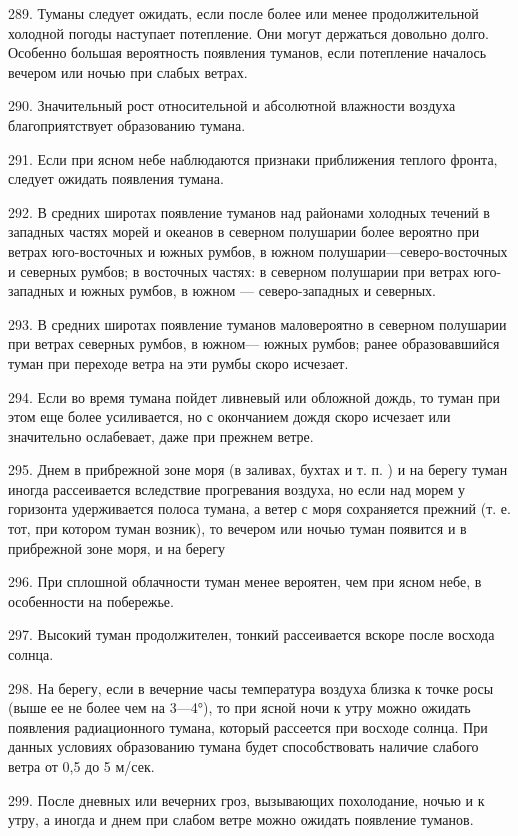 289. Туманы следует ожидать, если после более или менее продолжительной холодной погоды наступает потепление. Они могут держаться довольно долго. Особенно большая вероятность появления туманов, если потепление началось вечером или ночью при слабых ветрах.

290. Значительный рост относительной и абсолютной влажности воздуха благоприятствует образованию тумана.

291. Если при ясном небе наблюдаются признаки приближения теплого фронта, следует ожидать появления тумана.

292. В средних широтах появление туманов над районами холодных течений в западных частях морей и океанов в северном полушарии более вероятно при ветрах юго-восточных и южных румбов, в южном полушарии—северо-восточных и северных румбов; в восточных частях: в северном полушарии при ветрах юго-западных и южных румбов, в южном — северо-западных и северных.

293. В средних широтах появление туманов маловероятно в северном полушарии при ветрах северных румбов, в южном— южных румбов; ранее образовавшийся туман при переходе ветра на эти румбы скоро исчезает.

294. Если во время тумана пойдет ливневый или обложной дождь, то туман при этом еще более усиливается, но с окончанием дождя скоро исчезает или значительно ослабевает, даже при прежнем ветре.

295. Днем в прибрежной зоне моря (в заливах, бухтах и т. п. ) и на берегу туман иногда рассеивается вследствие прогревания воздуха, но если над морем у горизонта удерживается полоса тумана, а ветер с моря сохраняется прежний (т. е. тот, при котором туман возник), то вечером или ночью туман появится и в прибрежной зоне моря, и на берегу

296. При сплошной облачности туман менее вероятен, чем при ясном небе, в особенности на побережье.

297. Высокий туман продолжителен, тонкий рассеивается вскоре после восхода солнца.

298. На берегу, если в вечерние часы температура воздуха близка к точке росы (выше ее не более чем на 3—4°), то при ясной ночи к утру можно ожидать появления радиационного тумана, который рассеется при восходе солнца. При данных условиях образованию тумана будет способствовать наличие слабого ветра от 0,5 до 5 м/сек.

299. После дневных или вечерних гроз, вызывающих похолодание, ночью и к утру, а иногда и днем при слабом ветре можно ожидать появление туманов.

